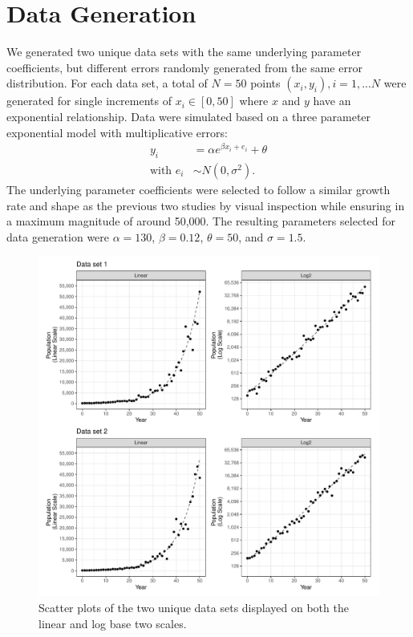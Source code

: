 \documentclass[print]{nuthesis}
\begin{document}
\hypertarget{data-generation-3}{%
\section{Data Generation}\label{data-generation-3}}

We generated two unique data sets with the same underlying parameter coefficients, but different errors randomly generated from the same error distribution.
For each data set, a total of \(N = 50\) points \((x_i, y_i), i = 1,...N\) were generated for single increments of \(x_i\in [0, 50]\) where \(x\) and \(y\) have an exponential relationship.
Data were simulated based on a three parameter exponential model with multiplicative errors:
\begin{align}
y_i & = \alpha e^{\beta x_i + e_i} + \theta \\
\text{with } e_i & \sim N(0, \sigma^2). \nonumber
\end{align}
The underlying parameter coefficients were selected to follow a similar growth rate and shape as the previous two studies by visual inspection while ensuring in a maximum magnitude of around 50,000.
The resulting parameters selected for data generation were \(\alpha = 130\), \(\beta = 0.12\), \(\theta = 50\), and \(\sigma = 1.5\).

\begin{figure}[tbp]

{\centering \includegraphics[width=1\linewidth,]{thesis_files/figure-latex/estimation-simulated-data-1} 

}

\caption[Estimation simulated data]{Scatter plots of the two unique data sets displayed on both the linear and log base two scales.}\label{fig:estimation-simulated-data}
\end{figure}
\end{document}
